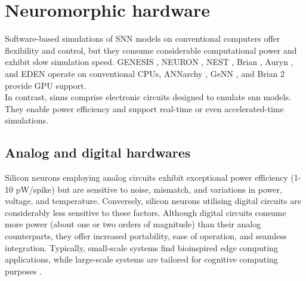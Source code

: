 \chapter{Neuromorphic hardware}
\label{ch4}
Software-based simulations of SNN models on conventional computers offer flexibility and control, but they consume considerable computational power and exhibit slow simulation speed. GENESIS \cite{Bower}, NEURON \cite{carnevale}, NEST \cite{Gewaltig}, Brian \cite{Goodman}, Auryn \cite{Zenke}, and EDEN \cite{Panagiotou} operate on conventional CPUs, ANNarchy \cite{Vitay}, GeNN \cite{Yavuz}, and Brian 2 \cite{Stimberg} provide GPU support.\\ 
In contrast, \acrshort{sinn}s comprise electronic circuits designed to emulate \acrshort{snn} models. They enable power efficiency and support real-time or even accelerated-time simulations.\\

\section{Analog and digital hardwares}
Silicon neurons employing analog circuits exhibit exceptional power efficiency (1-10 pW/spike) but are sensitive to noise, mismatch, and variations in power, voltage, and temperature. Conversely, silicon neurons utilising digital circuits are considerably less sensitive to these factors. Although digital circuits consume more power (about one or two orders of magnitude) than their analog counterparts, they offer increased portability, ease of operation, and seamless integration. Typically, small-scale systems find bioinspired edge computing applications, while large-scale systems are tailored for cognitive computing purposes \cite{Frenkel2023}.\\

